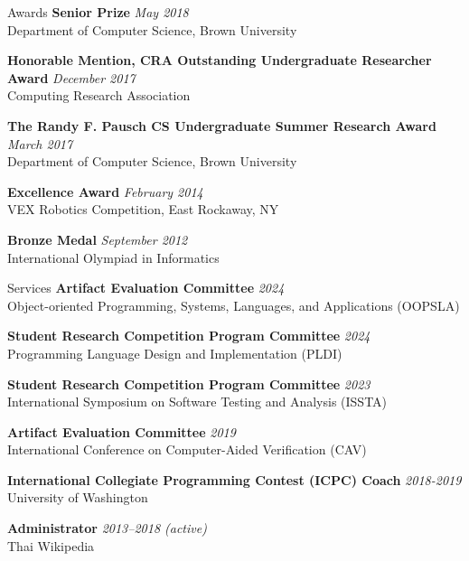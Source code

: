 \documentclass{resume} %
\begin{document}
\begin{rSection}{Awards}
{\bf Senior Prize} \hfill {\em May 2018} \\
Department of Computer Science, Brown University

{\bf Honorable Mention, CRA Outstanding Undergraduate Researcher Award} \hfill {\em December 2017} \\
Computing Research Association

{\bf The Randy F. Pausch CS Undergraduate Summer Research Award} \hfill {\em March 2017} \\
Department of Computer Science, Brown University

{\bf Excellence Award} \hfill{\em February 2014} \\
VEX Robotics Competition, East Rockaway, NY

{\bf Bronze Medal} \hfill {\em September 2012} \\
International Olympiad in Informatics
\end{rSection}

\begin{rSection}{Services}
  {\bf Artifact Evaluation Committee} \hfill {\em 2024} \\
  Object-oriented Programming, Systems, Languages, and Applications (OOPSLA)

  {\bf Student Research Competition Program Committee} \hfill {\em 2024} \\
  Programming Language Design and Implementation (PLDI)

  {\bf Student Research Competition Program Committee} \hfill {\em 2023} \\
  International Symposium on Software Testing and Analysis (ISSTA)

  {\bf Artifact Evaluation Committee} \hfill {\em 2019} \\
  International Conference on Computer-Aided Verification (CAV)

  {\bf International Collegiate Programming Contest (ICPC) Coach} \hfill {\em 2018-2019} \\
  University of Washington

  {\bf Administrator} \hfill {\em 2013--2018 (active)}\\
  Thai Wikipedia
\end{rSection}
\end{document}
